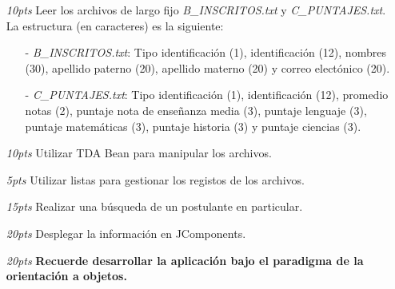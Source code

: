 \documentclass[10pt]{article}
\begin{document}
\begin{enumerate}
    \begin{enumerate}[label=(\alph*)]
		\item[\emph{10pts}] Leer los archivos de largo fijo \emph{B\_INSCRITOS.txt} y \emph{C\_PUNTAJES.txt}. La estructura (en caracteres) es la siguiente:
		\begin{enumerate}
		    \item[-] \emph{B\_INSCRITOS.txt}: Tipo identificaci\'on (1), identificaci\'on (12), nombres (30), apellido paterno (20), apellido materno (20) y correo elect\'onico (20).
		    \item[-] \emph{C\_PUNTAJES.txt}: Tipo identificaci\'on (1), identificaci\'on (12), promedio notas (2), puntaje nota de ense\~nanza media (3), puntaje lenguaje (3), puntaje matem\'aticas (3), puntaje historia (3) y puntaje ciencias (3).
		\end{enumerate}
		\item[\emph{10pts}] Utilizar TDA Bean para manipular los archivos.
		\item[\emph{5pts}] Utilizar listas para gestionar los registos de los archivos.
		\item[\emph{15pts}] Realizar una b\'usqueda de un postulante en particular.
		\item[\emph{20pts}] Desplegar la informaci\'on en JComponents.
		\item[\emph{20pts}] \textbf{Recuerde desarrollar la aplicaci\'on bajo el paradigma de la orientaci\'on a objetos.}
	\end{enumerate}

	\end{enumerate}
\end{document}
